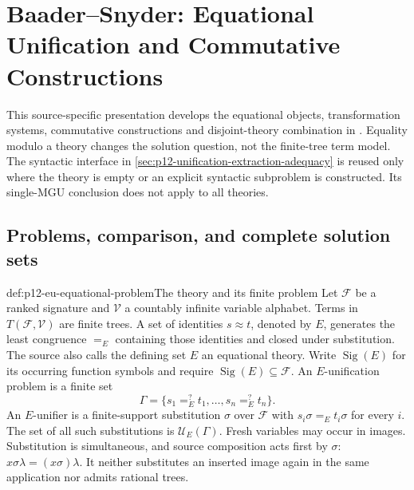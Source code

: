 \section{Baader--Snyder: Equational Unification and Commutative Constructions}
\label{sec:p12-n-c-035-05}

This source-specific presentation develops the equational objects,
transformation systems, commutative constructions and disjoint-theory
combination in \cite[\S\S3--6, retained chapter
pp.~469--519]{BaaderSnyder2001}. Equality modulo a theory
changes the solution question, not the finite-tree term model.
The syntactic interface in \cref{sec:p12-unification-extraction-adequacy}
is reused only where the theory is empty or an explicit syntactic subproblem
is constructed. Its single-MGU conclusion does not apply to all theories.

\subsection{Problems, comparison, and complete solution sets}

\begin{hbdefinition}{def:p12-eu-equational-problem}{The theory and its finite problem}
Let \(\mathcal F\) be a ranked signature and \(\mathcal V\) a countably
infinite variable alphabet. Terms in \(T(\mathcal F,\mathcal V)\) are
finite trees. A set of identities \(s\approx t\), denoted by \(E\),
generates the least congruence \(=_{E}\) containing those identities
and closed under substitution. The source also calls the defining set
\(E\) an equational theory. Write \(\operatorname{Sig}(E)\) for its
occurring function symbols and require
\(\operatorname{Sig}(E)\subseteq\mathcal F\).
An \(E\)-unification problem is a finite set
\[
 \Gamma=\{s_1=^{?}_{E}t_1,\ldots,s_n=^{?}_{E}t_n\}.
\]
An \(E\)-unifier is a finite-support substitution \(\sigma\) over
\(\mathcal F\) with \(s_i\sigma=_E t_i\sigma\) for every \(i\).
The set of all such substitutions is \(\mathcal U_E(\Gamma)\). Fresh variables
may occur in images. Substitution is simultaneous, and source composition
acts first by \(\sigma\): \(x\sigma\lambda=(x\sigma)\lambda\).
It neither substitutes an inserted image again in the same application
nor admits rational trees. \cite[Definition 3.1, pp.~469--470]{BaaderSnyder2001}
\end{hbdefinition}

